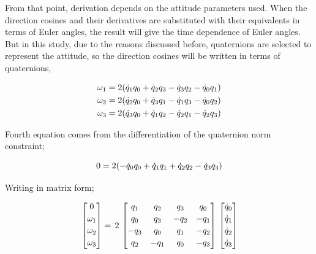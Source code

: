 From that point, derivation depends on the attitude parameters used. 
When the direction cosines and their derivatives are substituted with their equivalents in terms of Euler angles, the result will give the time dependence of Euler angles. 
But in this study, due to the reasons discussed before, quaternions are selected to represent the attitude, so the direction cosines will be written in terms of quaternions,

\begin{align}{\label{eqn:angVelocityQuaternion}}
\begin{split}
\omega_1 & = 2 (\dot{q}_1 q_0 + \dot{q}_2 q_3 - \dot{q}_3 q_2 - \dot{q}_0 q_1) \\
\omega_2 & = 2 (\dot{q}_2 q_0 + \dot{q}_3 q_1 - \dot{q}_1 q_3 - \dot{q}_0 q_2) \\
\omega_3 & = 2 (\dot{q}_3 q_0 + \dot{q}_1 q_2 - \dot{q}_2 q_1 - \dot{q}_2 q_3)\\
\end{split}
\end{align}

Fourth equation comes from the differentiation of the quaternion norm constraint;

\begin{equation}{\label{eqn:kinematicEquDQM}}
0 = 2 (- \dot{q}_0 q_0 + \dot{q}_1 q_1 + \dot{q}_2 q_2 - \dot{q}_3 q_3)
\end{equation}

Writing in matrix form;

\begin{equation}{\label{eqn:kinematicEquAngVel}}
\begin{bmatrix}
0\\[0.2em]
\omega_1\\[0.2em]
\omega_2\\[0.2em]
\omega_3\\[0.2em]
\end{bmatrix}
 =\,
 2\,
\begin{bmatrix}
q_1 & q_2 & q_3 & q_0 \\[0.2em]
q_0 & q_3 & -q_2 & -q_1 \\[0.2em]
-q_3 & q_0 & q_1 & -q_2 \\[0.2em]
q_2 & -q_1 & q_0 & -q_3 \\[0.2em]
\end{bmatrix}
\,
\begin{bmatrix}
\dot{q}_0\\[0.2em]
\dot{q}_1\\[0.2em]
\dot{q}_2\\[0.2em]
\dot{q}_3\\[0.2em]
\end{bmatrix}
\end{equation}
 
